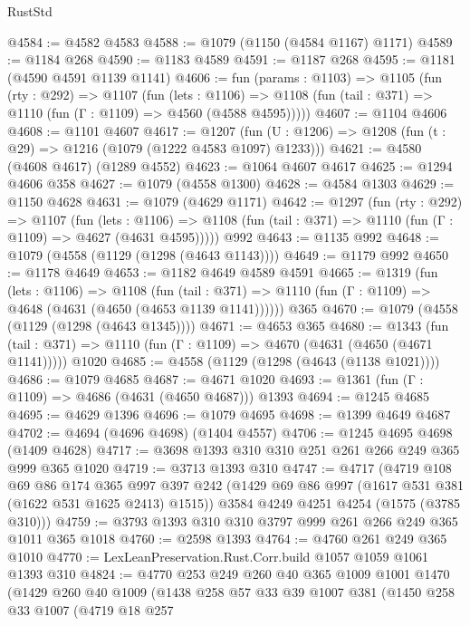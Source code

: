 \begin{lexlean}{RustStd}
\begin{coremodule}
{\begin{coremodule}
{{{{{{{{{{@4584 := @4582 @4583
@4588 := @1079 (@1150 (@4584 @1167) @1171)
@4589 := @1184 @268
@4590 := @1183 @4589
@4591 := @1187 @268
@4595 := @1181 (@4590 @4591 @1139 @1141)
@4606 := fun (params : @1103) =>
  @1105
    (fun (rty : @292) =>
    @1107
      (fun (lets : @1106) =>
      @1108 (fun (tail : @371) => @1110 (fun (Γ : @1109) => @4560 (@4588 @4595)))))
@4607 := @1104 @4606
@4608 := @1101 @4607
@4617 := @1207 (fun (U : @1206) => @1208 (fun (t : @29) => @1216 (@1079 (@1222 @4583 @1097) @1233)))
@4621 := @4580 (@4608 @4617) (@1289 @4552)
@4623 := @1064 @4607 @4617
@4625 := @1294 @4606 @358
@4627 := @1079 (@4558 @1300)
@4628 := @4584 @1303
@4629 := @1150 @4628
@4631 := @1079 (@4629 @1171)
@4642 := @1297
    (fun (rty : @292) =>
    @1107
      (fun (lets : @1106) =>
      @1108 (fun (tail : @371) => @1110 (fun (Γ : @1109) => @4627 (@4631 @4595)))))
    @992
@4643 := @1135 @992
@4648 := @1079 (@4558 (@1129 (@1298 (@4643 @1143))))
@4649 := @1179 @992
@4650 := @1178 @4649
@4653 := @1182 @4649 @4589 @4591
@4665 := @1319
    (fun (lets : @1106) =>
    @1108
      (fun (tail : @371) => @1110 (fun (Γ : @1109) => @4648 (@4631 (@4650 (@4653 @1139 @1141))))))
    @365
@4670 := @1079 (@4558 (@1129 (@1298 (@4643 @1345))))
@4671 := @4653 @365
@4680 := @1343
    (fun (tail : @371) => @1110 (fun (Γ : @1109) => @4670 (@4631 (@4650 (@4671 @1141)))))
    @1020
@4685 := @4558 (@1129 (@1298 (@4643 (@1138 @1021))))
@4686 := @1079 @4685
@4687 := @4671 @1020
@4693 := @1361 (fun (Γ : @1109) => @4686 (@4631 (@4650 @4687))) @1393
@4694 := @1245 @4685
@4695 := @4629 @1396
@4696 := @1079 @4695
@4698 := @1399 @4649 @4687
@4702 := @4694 (@4696 @4698) (@1404 @4557)
@4706 := @1245 @4695 @4698 (@1409 @4628)
@4717 := @3698 @1393 @310 @310 @251 @261 @266 @249 @365 @999 @365 @1020
@4719 := @3713 @1393 @310
@4747 := @4717
    (@4719
      @108
      @69
      @86
      @174
      @365
      @997
      @397
      @242
      (@1429 @69 @86 @997 (@1617 @531 @381 (@1622 @531 @1625 @2413) @1515))
      @3584
      @4249
      @4251
      @4254
      (@1575 (@3785 @310)))
@4759 := @3793 @1393 @310 @310 @3797 @999 @261 @266 @249 @365 @1011 @365 @1018
@4760 := @2598 @1393
@4764 := @4760 @261 @249 @365 @1010
@4770 := LexLeanPreservation.Rust.Corr.build @1057 @1059 @1061 @1393 @310
@4824 := @4770
    @253
    @249
    @260
    @40
    @365
    @1009
    @1001
    @1470
    (@1429
      @260
      @40
      @1009
      (@1438
        @258
        @57
        @33
        @39
        @1007
        @381
        (@1450
          @258
          @33
          @1007
          (@4719
            @18
            @257
}}}}}}}}}}
\end{coremodule}}
\end{coremodule}
\end{lexlean}

